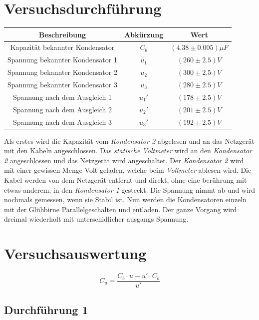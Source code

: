 \documentclass[a4paper,12pt]{article}
\begin{document}
\section{Versuchsdurchführung}
\begin{table}[H]
    \centering
    \begin{tabular}{|c|c|c|}
        \hline
        \textbf{Beschreibung} & \textbf{Abkürzung} & \textbf{Wert} \\
        \hline
        Kapazität bekannter Kondensator & $C_{b}$ & $(4.38\pm 0.005 )\mu F$\\
        \hline
        Spannung bekannter Kondensator 1 & $u_{1}$ & $(260\pm 2.5)V$\\
        Spannung bekannter Kondensator 2 & $u_{2}$ & $(300\pm 2.5)V$\\
        Spannung bekannter Kondensator 3 & $u_{3}$ & $(280\pm 2.5)V$\\
        \hline
        Spannung nach dem Ausgleich 1 & $u_{1}'$ & $(178\pm 2.5)V$\\
        Spannung nach dem Ausgleich 2 & $u_{2}'$ & $(201\pm 2.5)V$\\
        Spannung nach dem Ausgleich 3 & $u_{3}'$ & $(192\pm 2.5)V$\\
        \hline
    \end{tabular}
\end{table}

Als erstes wird die Kapazität vom \textit{Kondensator 2} abgelesen und an das Netzgerät mit den Kabeln angeschlossen. Das \textit{statische Voltmeter} wird an den \textit{Kondensator 2} angeschlossen und das Netzgerät wird angeschaltet. Der \textit{Kondensator 2} wird mit einer gewissen Menge Volt geladen, welche beim \textit{Voltmeter} ablesen wird. Die Kabel werden von dem Netzgerät entfernt und direkt, ohne eine berührung mit etwas anderem, in den \textit{Kondensator 1} gesteckt. Die Spannung nimmt ab und wird nochmals gemessen, wenn sie Stabil ist. Nun werden die Kondensatoren einzeln mit der Glühbirne Parallelgeschalten und entladen. Der ganze Vorgang wird dreimal wiederholt mit unterschidlicher ausgangs Spannung. 

\newpage
\section{Versuchsauswertung}

$$C_u = \frac{C_b \cdot u - u' \cdot C_b}{u'}$$

\subsection{Durchführung 1}
\end{document}
